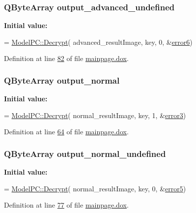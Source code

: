 \subsubsection[{\texorpdfstring{output\+\_\+advanced\+\_\+undefined}{output_advanced_undefined}}]{\setlength{\rightskip}{0pt plus 5cm}Q\+Byte\+Array output\+\_\+advanced\+\_\+undefined}\hypertarget{mainpage_8dox_a7415e312c3c8019034882cde9a8d048d}{}\label{mainpage_8dox_a7415e312c3c8019034882cde9a8d048d}
{\bfseries Initial value\+:}
\begin{DoxyCode}
= \hyperlink{class_model_p_c_a902abaea4f07995b48c0f2fea6eceb7c}{ModelPC::Decrypt}(
        advanced\_resultImage,
        key,
        0,
        &\hyperlink{mainpage_8dox_a92da3be57b27bb827f55e05120cb9827}{error6})
\end{DoxyCode}


Definition at line \hyperlink{mainpage_8dox_source_l00082}{82} of file \hyperlink{mainpage_8dox_source}{mainpage.\+dox}.

\subsubsection[{\texorpdfstring{output\+\_\+normal}{output_normal}}]{\setlength{\rightskip}{0pt plus 5cm}Q\+Byte\+Array output\+\_\+normal}\hypertarget{mainpage_8dox_a0afa9d6eb2804da072bf16223098cab5}{}\label{mainpage_8dox_a0afa9d6eb2804da072bf16223098cab5}
{\bfseries Initial value\+:}
\begin{DoxyCode}
= \hyperlink{class_model_p_c_a902abaea4f07995b48c0f2fea6eceb7c}{ModelPC::Decrypt}(
        normal\_resultImage,
        key,
        1,
        &\hyperlink{mainpage_8dox_a0a5bd4c1e9106a6efb2b5ab3cbb58e29}{error3})
\end{DoxyCode}


Definition at line \hyperlink{mainpage_8dox_source_l00064}{64} of file \hyperlink{mainpage_8dox_source}{mainpage.\+dox}.

\subsubsection[{\texorpdfstring{output\+\_\+normal\+\_\+undefined}{output_normal_undefined}}]{\setlength{\rightskip}{0pt plus 5cm}Q\+Byte\+Array output\+\_\+normal\+\_\+undefined}\hypertarget{mainpage_8dox_a2acf283263ed72aa1a26ed7dd98aa62a}{}\label{mainpage_8dox_a2acf283263ed72aa1a26ed7dd98aa62a}
{\bfseries Initial value\+:}
\begin{DoxyCode}
= \hyperlink{class_model_p_c_a902abaea4f07995b48c0f2fea6eceb7c}{ModelPC::Decrypt}(
        normal\_resultImage,
        key,
        0,
        &\hyperlink{mainpage_8dox_ad35f2250b1706e4aefd45d82d2aa1255}{error5})
\end{DoxyCode}


Definition at line \hyperlink{mainpage_8dox_source_l00077}{77} of file \hyperlink{mainpage_8dox_source}{mainpage.\+dox}.

